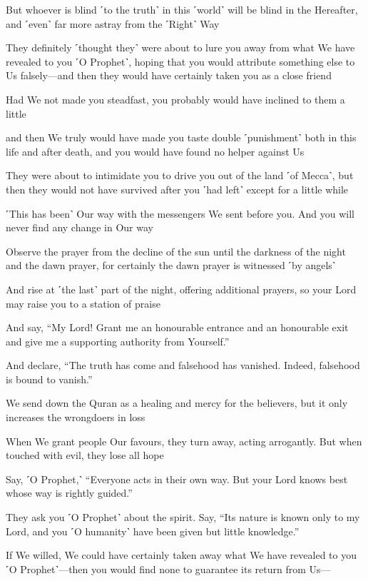 But whoever is blind ˹to the truth˺ in this ˹world˺ will be blind in the Hereafter, and ˹even˺ far more astray from the ˹Right˺ Way

They definitely ˹thought they˺ were about to lure you away from what We have revealed to you ˹O Prophet˺, hoping that you would attribute something else to Us falsely—and then they would have certainly taken you as a close friend

Had We not made you steadfast, you probably would have inclined to them a little

and then We truly would have made you taste double ˹punishment˺ both in this life and after death, and you would have found no helper against Us

They were about to intimidate you to drive you out of the land ˹of Mecca˺, but then they would not have survived after you ˹had left˺ except for a little while

˹This has been˺ Our way with the messengers We sent before you. And you will never find any change in Our way

Observe the prayer from the decline of the sun until the darkness of the night and the dawn prayer, for certainly the dawn prayer is witnessed ˹by angels˺

And rise at ˹the last˺ part of the night, offering additional prayers, so your Lord may raise you to a station of praise

And say, “My Lord! Grant me an honourable entrance and an honourable exit and give me a supporting authority from Yourself.”

And declare, “The truth has come and falsehood has vanished. Indeed, falsehood is bound to vanish.”

We send down the Quran as a healing and mercy for the believers, but it only increases the wrongdoers in loss

When We grant people Our favours, they turn away, acting arrogantly. But when touched with evil, they lose all hope

Say, ˹O Prophet,˺ “Everyone acts in their own way. But your Lord knows best whose way is rightly guided.”

They ask you ˹O Prophet˺ about the spirit. Say, “Its nature is known only to my Lord, and you ˹O humanity˺ have been given but little knowledge.”

If We willed, We could have certainly taken away what We have revealed to you ˹O Prophet˺—then you would find none to guarantee its return from Us—

